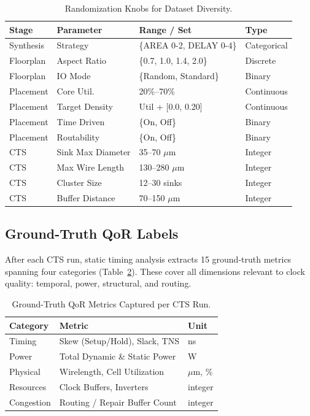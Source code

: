 \documentclass[acmsmall,review,anonymous]{acmart}
\begin{document}
\begin{table}[htbp]
\centering
\small
\caption{Randomization Knobs for Dataset Diversity.}
\label{tab:knobs}
\begin{tabular}{llll}
\toprule
\textbf{Stage} & \textbf{Parameter} & \textbf{Range / Set} & \textbf{Type} \\
\midrule
Synthesis   & Strategy      & \{AREA 0-2, DELAY 0-4\}   & Categorical \\
Floorplan   & Aspect Ratio  & \{0.7, 1.0, 1.4, 2.0\}   & Discrete \\
Floorplan   & IO Mode       & \{Random, Standard\}      & Binary \\
Placement   & Core Util.    & 20\%--70\%                & Continuous \\
Placement   & Target Density & Util + [0.0, 0.20]      & Continuous \\
Placement   & Time Driven   & \{On, Off\}               & Binary \\
Placement   & Routability   & \{On, Off\}               & Binary \\
\midrule
CTS & Sink Max Diameter   & 35--70 $\mu$m             & Integer \\
CTS & Max Wire Length     & 130--280 $\mu$m           & Integer \\
CTS & Cluster Size        & 12--30 sinks              & Integer \\
CTS & Buffer Distance     & 70--150 $\mu$m            & Integer \\
\bottomrule
\end{tabular}
\end{table}

\subsection{Ground-Truth QoR Labels}

After each CTS run, static timing analysis extracts 15 ground-truth metrics
spanning four categories (Table~\ref{tab:metrics}). These cover all
dimensions relevant to clock quality: temporal, power, structural, and
routing.

\begin{table}[htbp]
\centering
\small
\caption{Ground-Truth QoR Metrics Captured per CTS Run.}
\label{tab:metrics}
\begin{tabular}{lll}
\toprule
\textbf{Category} & \textbf{Metric} & \textbf{Unit} \\
\midrule
Timing   & Skew (Setup/Hold), Slack, TNS & ns \\
Power    & Total Dynamic \& Static Power & W \\
Physical & Wirelength, Cell Utilization  & $\mu$m, \% \\
Resources & Clock Buffers, Inverters     & integer \\
Congestion & Routing / Repair Buffer Count & integer \\
\bottomrule
\end{tabular}
\end{table}
\end{document}
